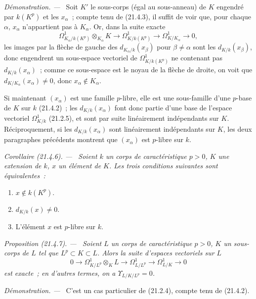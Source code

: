 \documentclass[10pt,oneside]{book}
\makeatletter
\newcommand{\setmanualcurrentlabel}[1]{\def\@currentlabel{#1}}
\newcommand{\oldpage}[2][]{%
  \setcounter{footnote}{0}%
  \marginpar{\scriptsize\textbf{#1}~|~#2}\ignorespaces}
\newenvironment{proposition}[1][]{%
  \setmanualcurrentlabel{#1}\par\medskip\noindent\itshape Proposition (#1). ---\ }{\par}
\newenvironment{corollary}[1][]{%
  \setmanualcurrentlabel{#1}\par\medskip\noindent\itshape Corollaire (#1). ---\ }{\par}
\newenvironment{proof}{%
  \par\medskip\noindent\textit{Démonstration. ---\ }}{\par}
\makeatother
\begin{document}
\begin{proof}
\oldpage[0\textsubscript{IV-1}]{164}
Soit $K'$ le sous-corps (égal au sous-anneau) de $K$ engendré par
$k(K^p)$ et les $x_\alpha$~; compte tenu de (21.4.3), il suffit de voir que,
pour chaque $\alpha$, $x_\alpha$ n'appartient pas à $K_\alpha$. Or, dans la
suite exacte
\[
\Omega^1_{K_\alpha/k(K^p)}\otimes_{K_\alpha}K\longrightarrow
\Omega^1_{K/k(K^p)}\longrightarrow\Omega^1_{K/K_\alpha}\longrightarrow0,
\]
les images par la flèche de gauche des $d_{K_\alpha/k}(x_\beta)$ pour
$\beta\neq\alpha$ sont les $d_{K/k}(x_\beta)$, donc engendrent un sous-espace
vectoriel de $\Omega^1_{K/k(K^p)}$ ne contenant pas $d_{K/k}(x_\alpha)$~; comme
ce sous-espace est le noyau de la flèche de droite, on voit que
$d_{K/K_\alpha}(x_\alpha)\neq0$, donc $x_\alpha\notin K_\alpha$.

Si maintenant $(x_\alpha)$ est une famille $p$-libre, elle est une sous-famille
d'une $p$-base de $K$ sur $k$ (21.4.2)~; les $d_{K/k}(x_\alpha)$ font donc
partie d'une base de l'espace vectoriel $\Omega^1_{K/k}$ (21.2.5), et sont
par suite linéairement indépendants sur $K$. Réciproquement, si les
$d_{K/k}(x_\alpha)$ sont linéairement indépendants sur $K$, les deux
paragraphes précédents montrent que $(x_\alpha)$ est $p$-libre sur $k$.
\end{proof}

\begin{corollary}[21.4.6]
\label{0.21.4.6-fr}
Soient $k$ un corps de caractéristique $p>0$, $K$ une extension de $k$,
$x$ un élément de $K$. Les trois conditions suivantes sont équivalentes~:
\begin{enumerate}
  \item[a)] $x\notin k(K^p)$.
  \item[b)] $d_{K/k}(x)\neq0$.
  \item[c)] L'élément $x$ est $p$-libre sur $k$.
\end{enumerate}
\end{corollary}

\begin{proposition}[21.4.7]
\label{0.21.4.7-fr}
Soient $L$ un corps de caractéristique $p>0$, $K$ un sous-corps de $L$ tel
que $L^p\subset K\subset L$. Alors la suite d'espaces vectoriels sur $L$
\begin{equation}
\tag{21.4.7.1}\label{0.21.4.7.1-fr}
0\to\Omega^1_{K/L^p}\otimes_KL\to\Omega^1_{L/L^p}
\to\Omega^1_{L/K}\to0
\end{equation}
est exacte~; en d'autres termes, on a $\Upsilon_{L/K/L^p}=0$.
\end{proposition}
\begin{proof}
C'est un cas particulier de (21.2.4), compte tenu de (21.4.2).
\end{proof}
\end{document}
